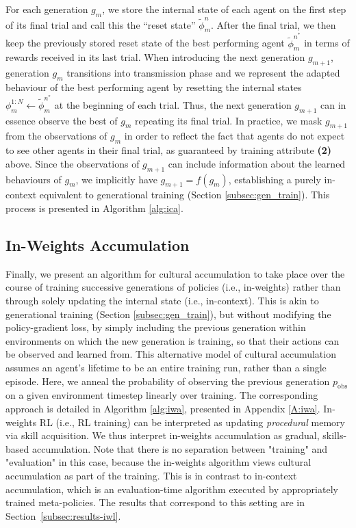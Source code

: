 \documentclass{article}
\begin{document}
For each generation $g_m$, we store the internal state of each agent on the first step of its final trial and call this the ``reset state'' $\tilde{\phi}^n_m$. After the final trial, we then keep the previously stored reset state of the best performing agent $\tilde{\phi}^{n^*}_m$ in terms of rewards received in its last trial. When introducing the next generation $g_{m+1}$, generation $g_m$ transitions into transmission phase and we represent the adapted behaviour of the best performing agent by resetting the internal states $\phi^{1:N}_m \gets \tilde{\phi}^{n^*}_m$ at the beginning of each trial. Thus, the next generation $g_{m+1}$ can in essence observe the best of $g_m$ repeating its final trial. In practice, we mask $g_{m+1}$ from the observations of $g_m$ in order to reflect the fact that agents do not expect to see other agents in their final trial, as guaranteed by training attribute \textbf{(2)} above. Since the observations of $g_{m+1}$ can include information about the learned behaviours of $g_m$, we implicitly have $g_{m+1} = f(g_m)$, establishing a purely in-context equivalent to generational training (Section \ref{subsec:gen_train}). This process is presented in Algorithm \ref{alg:ica}. 

\subsection{In-Weights Accumulation}

Finally, we present an algorithm for cultural accumulation to take place over the course of training successive generations of policies (i.e., in-weights) rather than through solely updating the internal state (i.e., in-context). This is akin to generational training (Section \ref{subsec:gen_train}), but without modifying the policy-gradient loss, by simply including the previous generation within environments on which the new generation is training, so that their actions can be observed and learned from. This alternative model of cultural accumulation assumes an agent's lifetime to be an entire training run, rather than a single episode. Here, we anneal the probability of observing the previous generation $p_{\text{obs}}$ on a given environment timestep linearly over training. The corresponding approach is detailed in Algorithm \ref{alg:iwa}, presented in Appendix \ref{A:iwa}. In-weights RL (i.e., RL training) can be interpreted as updating \textit{procedural} memory \citep{johnson2003procedural} via skill acquisition. We thus interpret in-weights accumulation as gradual, skills-based accumulation. Note that there is no separation between "training" and "evaluation" in this case, because the in-weights algorithm views cultural accumulation as part of the training. This is in contrast to in-context accumulation, which is an evaluation-time algorithm executed by appropriately trained meta-policies. The results that correspond to this setting are in Section~\ref{subsec:results-iwl}.
\end{document}
